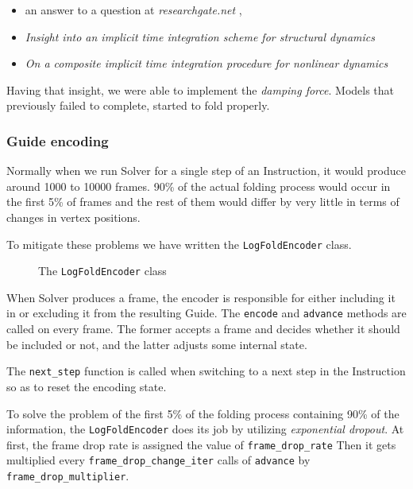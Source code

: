 \begin{itemize}
	\item an answer to a question at \textit{researchgate.net} \cite{researchgate:what-is-damping},
	\item \textit{Insight into an implicit time integration scheme for structural dynamics} \cite{damping1}
	\item \textit{On a composite implicit time integration procedure for nonlinear dynamics} \cite{damping2}
\end{itemize}

Having that insight, we were able to implement the \textit{damping force}. Models that previously failed to complete, started to fold properly.
\clearpage
\subsubsection{Guide encoding}

Normally when we run Solver for a single step of an Instruction, it would produce around 
1000 to 10000 frames.
90\% of the actual folding process would occur in the first 5\% of frames and the rest of them would differ by very little in terms of changes in vertex positions.

To mitigate these problems we have written the \texttt{LogFoldEncoder} class.

\begin{figure}[H]
	\caption{The \texttt{LogFoldEncoder} class}
	
\end{figure}

When Solver produces a frame, the encoder is responsible for either including it in or excluding it from the resulting Guide.
The \texttt{encode} and \texttt{advance} methods are called on every frame.
The former accepts a frame and decides whether it should be included or not, 
and the latter adjusts some internal state.

The \texttt{next\_step} function is called when switching to a next step in the Instruction so as to reset the encoding state.

To solve the problem of the first 5\% of the folding process containing 90\% of the information, the
\texttt{LogFoldEncoder} does its job by utilizing \textit{exponential dropout}.
At first, the frame drop rate is assigned the value of \texttt{frame\_drop\_rate}
Then it gets multiplied every \texttt{frame\_drop\_change\_iter} calls of \texttt{advance}
by \texttt{frame\_drop\_multiplier}.


